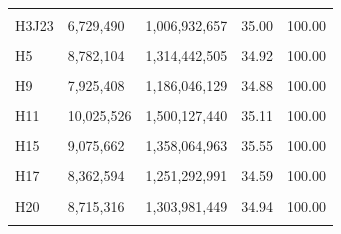\documentclass[
  a4paper,
  titlepage]{article}
\begin{document}
\begin{longtable}[t]{lllll}
\cellcolor{gray!6}{H3J22} & \cellcolor{gray!6}{9,073,194} & \cellcolor{gray!6}{1,357,634,556} & \cellcolor{gray!6}{35.28} & \cellcolor{gray!6}{100.00}\\
 
H3J23 & 6,729,490 & 1,006,932,657 & 35.00 & 100.00\\
 
\cellcolor{gray!6}{H4} & \cellcolor{gray!6}{9,512,958} & \cellcolor{gray!6}{1,423,696,890} & \cellcolor{gray!6}{35.26} & \cellcolor{gray!6}{100.00}\\
 
H5 & 8,782,104 & 1,314,442,505 & 34.92 & 100.00\\
 
\cellcolor{gray!6}{H8} & \cellcolor{gray!6}{7,870,052} & \cellcolor{gray!6}{1,177,999,125} & \cellcolor{gray!6}{34.83} & \cellcolor{gray!6}{100.00}\\
 
H9 & 7,925,408 & 1,186,046,129 & 34.88 & 100.00\\
 
\cellcolor{gray!6}{H10} & \cellcolor{gray!6}{10,369,304} & \cellcolor{gray!6}{1,552,147,216} & \cellcolor{gray!6}{34.58} & \cellcolor{gray!6}{100.00}\\
 
H11 & 10,025,526 & 1,500,127,440 & 35.11 & 100.00\\
 
\cellcolor{gray!6}{H13} & \cellcolor{gray!6}{10,201,542} & \cellcolor{gray!6}{1,527,224,016} & \cellcolor{gray!6}{34.79} & \cellcolor{gray!6}{100.00}\\
 
H15 & 9,075,662 & 1,358,064,963 & 35.55 & 100.00\\
 
\cellcolor{gray!6}{H16} & \cellcolor{gray!6}{10,072,608} & \cellcolor{gray!6}{1,507,245,286} & \cellcolor{gray!6}{34.74} & \cellcolor{gray!6}{100.00}\\
 
H17 & 8,362,594 & 1,251,292,991 & 34.59 & 100.00\\
 
\cellcolor{gray!6}{H18} & \cellcolor{gray!6}{10,594,506} & \cellcolor{gray!6}{1,584,983,605} & \cellcolor{gray!6}{34.42} & \cellcolor{gray!6}{100.00}\\
 
H20 & 8,715,316 & 1,303,981,449 & 34.94 & 100.00\\
 
\cellcolor{gray!6}{H21} & \cellcolor{gray!6}{8,766,548} & \cellcolor{gray!6}{1,311,854,233} & \cellcolor{gray!6}{34.89} & \cellcolor{gray!6}{100.00}\\
 

\end{longtable}
\end{document}
